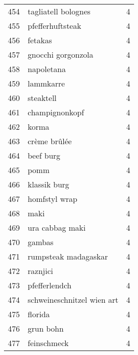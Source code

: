 \begin{tabular}{llr}
454  &                                tagliatell bolognes &      4 \\
455  &                                   pfefferhuftsteak &      4 \\
456  &                                            fetakas &      4 \\
457  &                                 gnocchi gorgonzola &      4 \\
458  &                                         napoletana &      4 \\
459  &                                          lammkarre &      4 \\
460  &                                          steaktell &      4 \\
461  &                                     champignonkopf &      4 \\
462  &                                              korma &      4 \\
463  &                                       crème brûlée &      4 \\
464  &                                          beef burg &      4 \\
465  &                                               pomm &      4 \\
466  &                                       klassik burg &      4 \\
467  &                                      homfstyl wrap &      4 \\
468  &                                               maki &      4 \\
469  &                                    ura cabbag maki &      4 \\
470  &                                             gambas &      4 \\
471  &                               rumpsteak madagaskar &      4 \\
472  &                                           raznjici &      4 \\
473  &                                      pfefferlendch &      4 \\
474  &                         schweineschnitzel wien art &      4 \\
475  &                                            florida &      4 \\
476  &                                          grun bohn &      4 \\
477  &                                        feinschmeck &      4 \\

\end{tabular}
